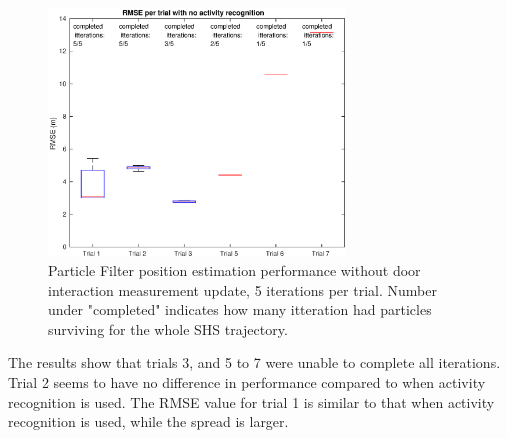 \begin{figure}[H]
	\centering
	\includegraphics[width=0.7\textwidth]{images/20201118_1507_RMSE_per_trial_with_no_activity_recognition}
	\caption[Particle Filter position estimation performance without door interaction]{Particle Filter position estimation performance without door interaction measurement update, 5 iterations per trial. Number under "completed" indicates how many itteration had particles surviving for the whole SHS trajectory.}
	\label{fig:pf_boxplot_no_doors}
\end{figure}

The results show that trials 3, and 5 to 7 were unable to complete all iterations. Trial 2 seems to have no difference in performance compared to when activity recognition is used. The RMSE value for trial 1 is similar to that when activity recognition is used, while the spread is larger.

